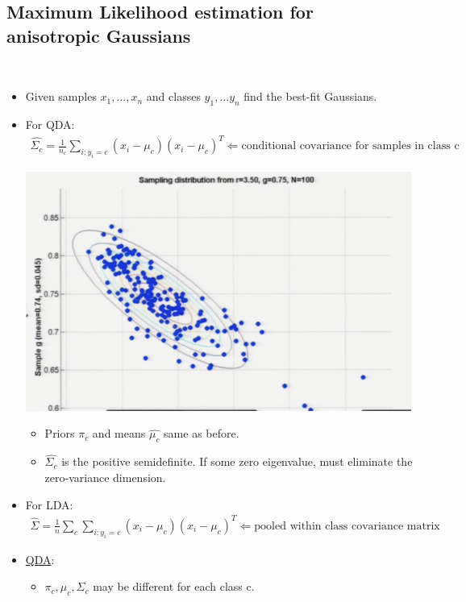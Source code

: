 \documentclass[10pt]{article}
\begin{document}
		\subsection*{Maximum Likelihood estimation for anisotropic Gaussians}
			\
			\begin{itemize}
				\item Given samples $x_{1}, \dots, x_{n}$ and classes $y_{1}, \dots y_{n}$ find the best-fit Gaussians.
				\item For QDA:
					\begin{align*}
						\hat{\Sigma_{c}} = \frac{1}{n_{c}} \sum_{i:y_{i}=c} (x_{i} - \mu_{c})(x_{i} - \mu_{c})^{T} \Leftarrow \text{conditional covariance for samples in class c}
					\end{align*}
					\begin{center}
						\includegraphics[scale=0.5]{../images/smaple}
					\end{center}
					\begin{itemize}
					\item Priors $\pi_{c}$ and means $\hat{\mu_{c}}$ same as before.
					\item $\hat{\Sigma_{c}}$ is the positive semidefinite. If some zero eigenvalue, must eliminate the zero-variance dimension.
					\end{itemize}
				\item For LDA:
					\begin{align*}
						\hat{\Sigma} = \frac{1}{n} \sum_{c} \sum_{i:y_{i}=c} (x_{i} - \mu_{c})(x_{i} - \mu_{c})^{T} \Leftarrow \text{pooled within class covariance matrix}
					\end{align*}
				\item \underline{QDA}:
					\begin{itemize}
						\item $\pi_{c}, \mu_{c}, \Sigma_{c}$ may be different for each class c.

\end{itemize}
\end{itemize}
\end{document}
